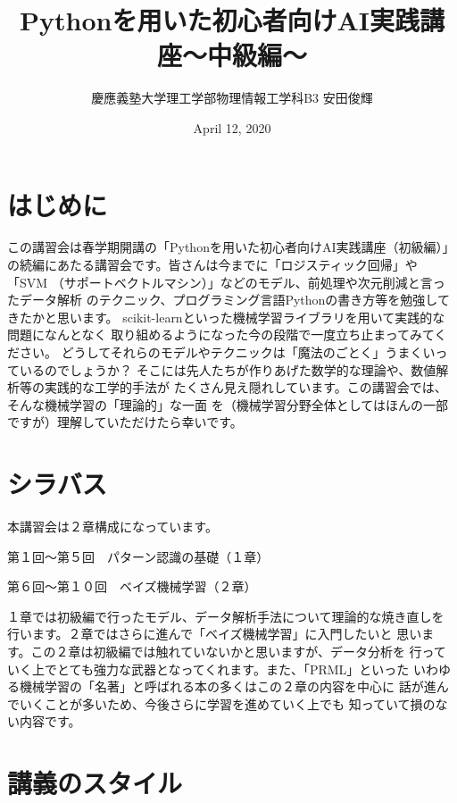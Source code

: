 \documentclass[
]{ltjarticle}
\title{Pythonを用いた初心者向けAI実践講座〜中級編〜}
\author{慶應義塾大学理工学部物理情報工学科B3 安田俊輝}
\date{April 12, 2020}
\begin{document}
\maketitle

\hypertarget{ux306fux3058ux3081ux306b}{%
\section{はじめに}\label{ux306fux3058ux3081ux306b}}

この講習会は春学期開講の「Pythonを用いた初心者向けAI実践講座（初級編）」
の続編にあたる講習会です。皆さんは今までに「ロジスティック回帰」や「SVM
（サポートベクトルマシン）」などのモデル、前処理や次元削減と言ったデータ解析
のテクニック、プログラミング言語Pythonの書き方等を勉強してきたかと思います。
scikit-learnといった機械学習ライブラリを用いて実践的な問題になんとなく
取り組めるようになった今の段階で一度立ち止まってみてください。
どうしてそれらのモデルやテクニックは「魔法のごとく」うまくいっているのでしょうか？
そこには先人たちが作りあげた数学的な理論や、数値解析等の実践的な工学的手法が
たくさん見え隠れしています。この講習会では、そんな機械学習の「理論的」な一面
を（機械学習分野全体としてはほんの一部ですが）理解していただけたら幸いです。

\hypertarget{ux30b7ux30e9ux30d0ux30b9}{%
\section{シラバス}\label{ux30b7ux30e9ux30d0ux30b9}}

本講習会は２章構成になっています。

第１回〜第５回　パターン認識の基礎（１章）

第６回〜第１０回　ベイズ機械学習（２章）

１章では初級編で行ったモデル、データ解析手法について理論的な焼き直しを
行います。２章ではさらに進んで「ベイズ機械学習」に入門したいと
思います。この２章は初級編では触れていないかと思いますが、データ分析を
行っていく上でとても強力な武器となってくれます。また、「PRML」といった
いわゆる機械学習の「名著」と呼ばれる本の多くはこの２章の内容を中心に
話が進んでいくことが多いため、今後さらに学習を進めていく上でも
知っていて損のない内容です。

\hypertarget{ux8b1bux7fa9ux306eux30b9ux30bfux30a4ux30eb}{%
\section{講義のスタイル}\label{ux8b1bux7fa9ux306eux30b9ux30bfux30a4ux30eb}}
\end{document}
